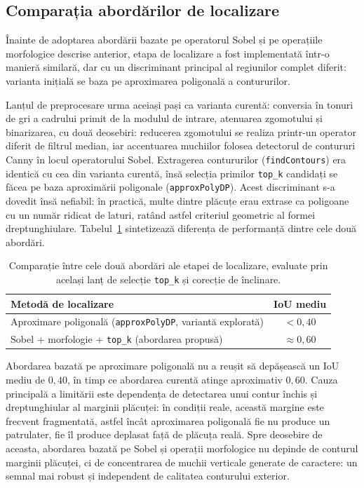 \subsection{Comparația abordărilor de localizare}
\indent\par
Înainte de adoptarea abordării bazate pe operatorul Sobel și pe operațiile morfologice descrise anterior, etapa de localizare a fost implementată într-o manieră similară, dar cu un discriminant principal al regiunilor complet diferit: varianta inițială se baza pe aproximarea poligonală a contururilor.

Lanțul de preprocesare urma aceiași pași ca varianta curentă: conversia în tonuri de gri a cadrului primit de la modulul de intrare, atenuarea zgomotului și binarizarea, cu două deosebiri: reducerea zgomotului se realiza printr-un operator diferit de filtrul median, iar accentuarea muchiilor folosea detectorul de contururi Canny în locul operatorului Sobel. Extragerea contururilor (\texttt{findContours}) era identică cu cea din varianta curentă, însă selecția primilor \texttt{top\_k} candidați se făcea pe baza aproximării poligonale (\texttt{approxPolyDP}). Acest discriminant s-a dovedit însă nefiabil: în practică, multe dintre plăcuțe erau extrase ca poligoane cu un număr ridicat de laturi, ratând astfel criteriul geometric al formei dreptunghiulare. Tabelul~\ref{tab:cmp-localizare} sintetizează diferența de performanță dintre cele două abordări.

\begin{table}[H]
  \centering
  \begin{tabular}{lc}
    \hline
    Metodă de localizare & IoU mediu \\
    \hline
    Aproximare poligonală (\texttt{approxPolyDP}, variantă explorată) & $< 0{,}40$ \\
    Sobel + morfologie + \texttt{top\_k} (abordarea propusă) & $\approx0{,}60$ \\
    \hline
  \end{tabular}
  \caption{Comparație între cele două abordări ale etapei de localizare, evaluate prin același lanț de selecție \texttt{top\_k} și corecție de înclinare.}
  \label{tab:cmp-localizare}
\end{table}

Abordarea bazată pe aproximare poligonală nu a reușit să depășească un IoU mediu de $0{,}40$, în timp ce abordarea curentă atinge aproximativ $0{,}60$. Cauza principală a limitării este dependența de detectarea unui contur închis și dreptunghiular al marginii plăcuței: în condiții reale, această margine este frecvent fragmentată, astfel încât aproximarea poligonală fie nu produce un patrulater, fie îl produce deplasat față de plăcuța reală. Spre deosebire de aceasta, abordarea bazată pe Sobel și operații morfologice nu depinde de conturul marginii plăcuței, ci de concentrarea de muchii verticale generate de caractere: un semnal mai robust și independent de calitatea conturului exterior.


